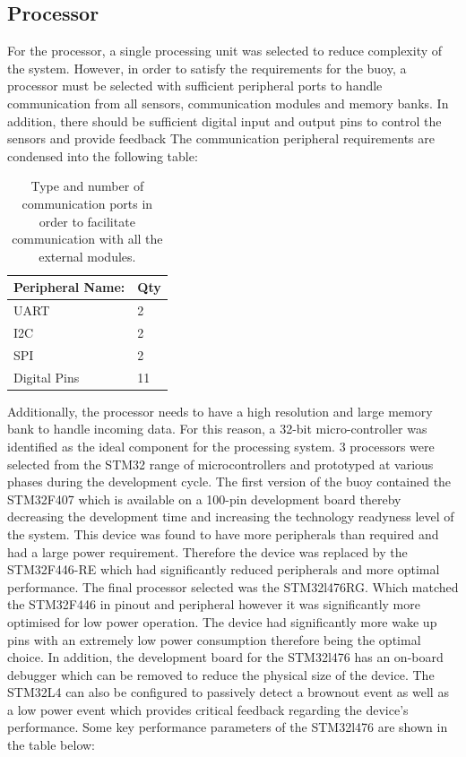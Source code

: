 \subsection{Processor}

For the processor, a single processing unit was selected to reduce complexity of the system. However, in order to satisfy the requirements for the buoy, a processor must be selected with sufficient peripheral ports to handle communication from all sensors, communication modules and memory banks. In addition, there should be sufficient digital input and output pins to control the sensors and provide feedback The communication peripheral requirements are condensed into the following table: 

\begin{table}[H]
    \centering
    \caption{ Type and number of communication ports in order to facilitate communication with  all the external modules.}
    \begin{tabular}{|l|l|}
        \hline \hline
        Peripheral Name: & Qty \\
        \hline \hline
        UART & 2\\
        I2C & 2\\
        SPI & 2\\
        Digital Pins & 11\\
        \hline 
    \end{tabular}
    \label{tab:micro_ports}
\end{table}

Additionally, the processor needs to have a high resolution and large memory bank to handle incoming data. For this reason, a 32-bit micro-controller was identified as the ideal component for the processing system. 3 processors were selected from the STM32 range of microcontrollers and prototyped at various phases during the development cycle. The first version of the buoy contained the STM32F407 which is available on a 100-pin development board thereby decreasing the development time and increasing the technology readyness level of the system. This device was found to have more peripherals than required and had a large power requirement. Therefore the device was replaced by the STM32F446-RE which had significantly reduced peripherals and more optimal performance. The final processor selected was the STM32l476RG. Which matched the STM32F446 in pinout and peripheral however it was significantly more optimised for low power operation. The device had significantly more wake up pins with an extremely low power consumption therefore being the optimal choice. In addition, the development board for the STM32l476 has an on-board debugger which can be removed to reduce the physical size of the device. The STM32L4 can also be configured to passively detect a brownout event as well as a low power event which provides critical feedback regarding the device's performance. Some key performance parameters of the STM32l476 are shown in the table below:
 
